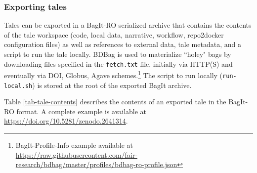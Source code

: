 \documentclass[conference]{IEEEtran}
\begin{document}
\subsubsection{Exporting tales}


Tales can be exported in a BagIt-RO serialized archive that contains
the contents of the tale workspace (code, local data, narrative,
workflow, repo2docker configuration files) as well as references to
external data, tale metadata, and a script to run the tale
locally. BDBag \cite{chard2016} is used to materialize ``holey" bags
by downloading files specified in the \texttt{fetch.txt} file,
initially via HTTP(S) and eventually via DOI, Globus, Agave
schemes.\footnote {BagIt-Profile-Info example available at \url{https://raw.githubusercontent.com/fair-research/bdbag/master/profiles/bdbag-ro-profile.json}}  The script to run locally  (\texttt{run-local.sh}) is stored at the root of the exported BagIt archive.

Table \ref{tab-tale-contents} describes the contents of an exported tale in the BagIt-RO format. A complete example is available at \href{https://doi.org/10.5281/zenodo.2641314}{https://doi.org/10.5281/zenodo.2641314}.
\end{document}
